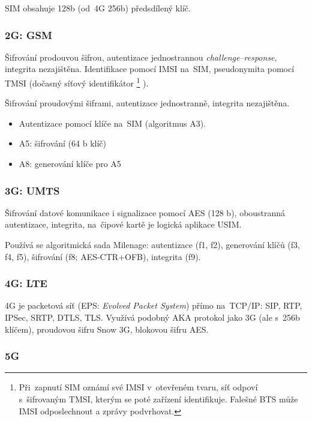 SIM obsahuje 128b (od~4G 256b) předsdílený klíč.



\subsubsection{2G: GSM}

Šifrování prodouvou šifrou, autentizace jednostrannou \emph{challenge--response}, integrita nezajištěna.
Identifikace pomocí IMSI na~SIM, pseudonymita pomocí TMSI (dočasný síťový identifikátor%
\footnote{Při~zapnutí SIM oznámí své IMSI v~otevřeném tvaru, síť odpoví s~šifrovaným TMSI, kterým se poté zařízení identifikuje. Falešné BTS může IMSI odposlechnout a zprávy podvrhovat.}%
).

Šifrování proudovými šiframi, autentizace jednostranně, integrita nezajištěna.

\begin{itemize}
    \item Autentizace pomocí klíče na~SIM (algoritmus A3).
    \item A5: šifrování (64 b klíč)
    \item A8: generování klíče pro A5
\end{itemize}



\subsubsection{3G: UMTS}

Šifrování datové komunikace i signalizace pomocí AES (128 b), oboustranná autentizace, integrita, na~čipové kartě je logická aplikace USIM.

Používá se algoritmická sada Milenage: autentizace (f1, f2), generování klíčů (f3, f4, f5), šifrování (f8; AES-CTR+OFB), integrita (f9).


\subsubsection{4G: LTE}

4G je packetová síť (EPS: \emph{Evolved Packet System}) přímo na~TCP/IP: SIP, RTP, IPSec, SRTP, DTLS, TLS.
Využívá podobný AKA protokol jako 3G (ale s~256b klíčem), proudovou šifru Snow 3G, blokovou šifru AES.



\subsubsection{5G}

